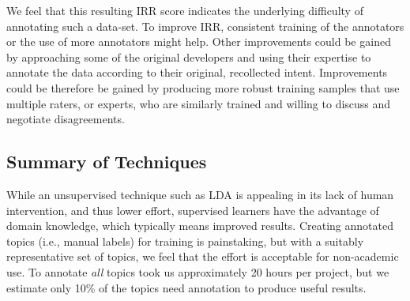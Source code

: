 \documentclass[smallextended]{svjour3}       %
\begin{document}
We feel that this resulting IRR score indicates
the underlying difficulty of annotating such a data-set. To improve IRR,
consistent training of the annotators or the use of more annotators might help.
Other improvements could be gained by approaching some of the original developers
and using their expertise to annotate the data according to their original, recollected intent.
Improvements
could be therefore be gained by producing more robust training samples that use
multiple raters, or experts, who are similarly trained and willing to discuss and
negotiate disagreements.









\subsection{Summary of Techniques}
While an unsupervised technique such as LDA is appealing in its lack of human intervention, and thus lower effort, 
supervised learners have the advantage of domain knowledge, which typically means improved results. 
Creating annotated topics (i.e., manual labels) for training is painstaking, but with a suitably representative set of topics, we feel that the effort is acceptable for non-academic use. To
annotate \emph{all} topics took us approximately 20 hours per project, but we estimate only 10\% of the topics need annotation to produce useful results.
\end{document}

